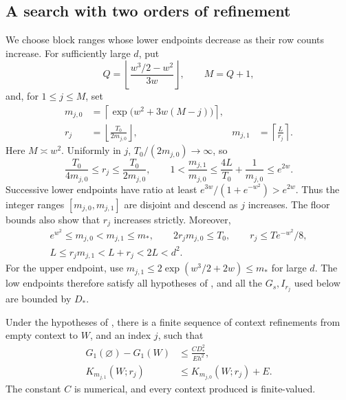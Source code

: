\subsection{A search with two orders of refinement}

We choose block ranges whose lower endpoints decrease as their row counts
increase. For sufficiently large $d$, put
\[
 Q=\left\lfloor\frac{w^3/2-w^2}{3w}\right\rfloor,\qquad M=Q+1,
\]
and, for $1\le j\le M$, set
\begin{equation}
 \begin{aligned}
 m_{j,0}&=\left\lceil\exp\bigl(w^2+3w(M-j)\bigr)\right\rceil,\\
 r_j&=\left\lfloor\frac{T_0}{2m_{j,0}}\right\rfloor,
 &m_{j,1}&=\left\lceil\frac L{r_j}\right\rceil .
 \end{aligned}
 \label{entropy-refinement:ranges}
\end{equation}
Here $M\asymp w^2$. Uniformly in $j$, $T_0/(2m_{j,0})\to\infty$, so
\[
 \frac{T_0}{4m_{j,0}}\le r_j\le\frac{T_0}{2m_{j,0}},\qquad
 1<\frac{m_{j,1}}{m_{j,0}}
 \le\frac{4L}{T_0}+\frac1{m_{j,0}}\le e^{2w}.
\]
Successive lower endpoints have ratio at least
$e^{3w}/(1+e^{-w^2})>e^{2w}$. Thus the integer ranges
$[m_{j,0},m_{j,1}]$ are disjoint and descend as $j$ increases.
The floor bounds also show that $r_j$ increases strictly. Moreover,
\begin{equation}
 \begin{gathered}
 e^{w^2}\le m_{j,0}<m_{j,1}\le m_*,
 \qquad 2r_jm_{j,0}\le T_0,\qquad r_j\le Te^{-w^2}/8,\\
 L\le r_jm_{j,1}<L+r_j<2L<d^2.
 \end{gathered}
 \label{entropy-refinement:range-bounds}
\end{equation}
For the upper endpoint, use
$m_{j,1}\le2\exp(w^3/2+2w)\le m_*$ for large $d$.
The low endpoints therefore satisfy all hypotheses of ,
and all the $G_s,I_{r_j}$ used below are bounded by $D_*$.

\begin{proposition}
\label{entropy-refinement:search}
Under the hypotheses of , there is a finite sequence
of context refinements from empty context to $W$, and an index $j$, such that
\begin{equation}
 \begin{split}
 G_1(\varnothing)-G_1(W)&\le\frac{CD_*^2}{Eh^2},\\
 K_{m_{j,1}}(W;r_j)&\le K_{m_{j,0}}(W;r_j)+E.
 \end{split}
 \label{entropy-refinement:search-conclusion}
\end{equation}
The constant $C$ is numerical, and every context produced is finite-valued.
\end{proposition}

